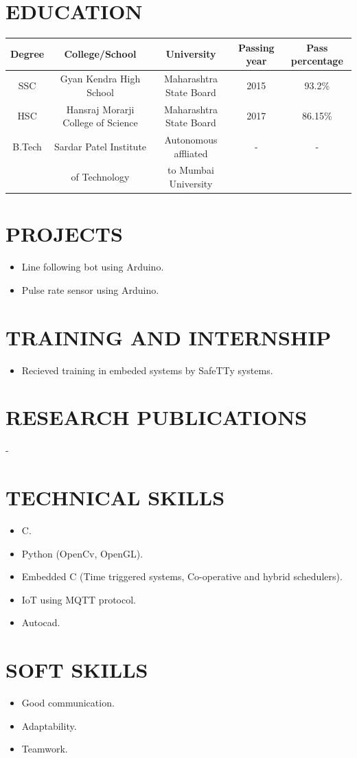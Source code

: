 \documentclass{article}
\begin{document}
\section*{\textbf{EDUCATION}}
\begin{tabular}{|c|c|c|c|c|}
\hline
Degree & College/School & University & Passing year & Pass percentage\\
\hline
SSC & Gyan Kendra High School & Maharashtra State Board & 2015 & 93.2\%\\
\hline
HSC & Hansraj Morarji College of Science & Maharashtra State Board & 2017 & 86.15\%\\
\hline
B.Tech & Sardar Patel Institute& Autonomous affliated  & - & -\\
 & of Technology & to Mumbai University & & \\
\hline 
\end{tabular}


\section*{\textbf{PROJECTS}}
\begin{itemize}
\item Line following bot using Arduino.
\item Pulse rate sensor using Arduino.
\end{itemize}

\section*{\textbf{TRAINING AND INTERNSHIP}}
\begin{itemize}
\item Recieved training in embeded systems by SafeTTy systems.
\end{itemize}


\section*{\textbf{RESEARCH PUBLICATIONS}}
-

\section*{\textbf{TECHNICAL SKILLS}}
\begin{itemize}
\item C.
\item Python (OpenCv, OpenGL).
\item Embedded C (Time triggered systems, Co-operative and hybrid schedulers).
\item IoT using MQTT protocol.
\item Autocad.
\end{itemize}


\section*{\textbf{SOFT SKILLS}}
\begin{itemize}
\item Good communication.
\item Adaptability.
\item Teamwork.
\end{itemize}
\end{document}
